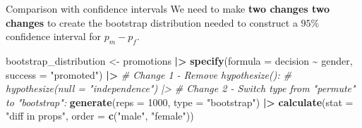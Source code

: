 \documentclass[
  ignorenonframetext,
]{beamer}
\newenvironment{Shaded}{\begin{snugshade}}{\end{snugshade}}
\newcommand{\AttributeTok}[1]{\textcolor[rgb]{0.13,0.29,0.53}{#1}}
\newcommand{\CommentTok}[1]{\textcolor[rgb]{0.56,0.35,0.01}{\textit{#1}}}
\newcommand{\DecValTok}[1]{\textcolor[rgb]{0.00,0.00,0.81}{#1}}
\newcommand{\FunctionTok}[1]{\textcolor[rgb]{0.13,0.29,0.53}{\textbf{#1}}}
\newcommand{\NormalTok}[1]{#1}
\newcommand{\OtherTok}[1]{\textcolor[rgb]{0.56,0.35,0.01}{#1}}
\newcommand{\SpecialCharTok}[1]{\textcolor[rgb]{0.81,0.36,0.00}{\textbf{#1}}}
\newcommand{\StringTok}[1]{\textcolor[rgb]{0.31,0.60,0.02}{#1}}
\begin{document}
\begin{frame}[fragile]{Comparison with confidence intervals}
\protect\hypertarget{comparison-with-confidence-intervals-1}{}
We need to make \textbf{two changes two changes} to create the bootstrap
distribution needed to construct a \(95\%\) confidence interval for
\(p_m-p_f\).

\begin{Shaded}
\begin{Highlighting}[]
\NormalTok{bootstrap\_distribution }\OtherTok{\textless{}{-}}\NormalTok{ promotions }\SpecialCharTok{|\textgreater{}} 
  \FunctionTok{specify}\NormalTok{(}\AttributeTok{formula =}\NormalTok{ decision }\SpecialCharTok{\textasciitilde{}}\NormalTok{ gender, }
          \AttributeTok{success =} \StringTok{"promoted"}\NormalTok{) }\SpecialCharTok{|\textgreater{}} 
  \CommentTok{\# Change 1 {-} Remove hypothesize():}
  \CommentTok{\# hypothesize(null = "independence") |\textgreater{} }
  \CommentTok{\# Change 2 {-} Switch type from "permute" to "bootstrap":}
  \FunctionTok{generate}\NormalTok{(}\AttributeTok{reps =} \DecValTok{1000}\NormalTok{, }\AttributeTok{type =} \StringTok{"bootstrap"}\NormalTok{) }\SpecialCharTok{|\textgreater{}} 
  \FunctionTok{calculate}\NormalTok{(}\AttributeTok{stat =} \StringTok{"diff in props"}\NormalTok{, }
            \AttributeTok{order =} \FunctionTok{c}\NormalTok{(}\StringTok{"male"}\NormalTok{, }\StringTok{"female"}\NormalTok{))}
\end{Highlighting}
\end{Shaded}
\end{frame}
\end{document}
